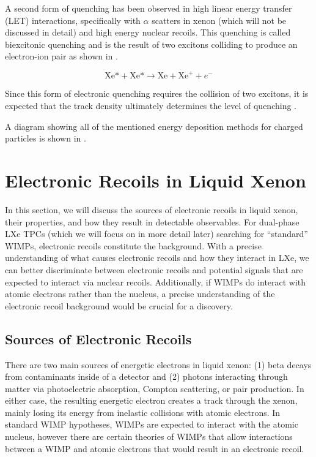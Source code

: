 A second form of quenching has been observed in high linear energy transfer (LET) interactions, specifically with $\alpha$ scatters in xenon (which will not be discussed in detail) and high energy nuclear recoils.  This quenching is called biexcitonic quenching and is the result of two excitons colliding to produce an electron-ion pair as shown in .

\begin{equation}
        \label{eqn:biexcitonic_quenching} 
        \textrm{Xe*} + \textrm{Xe*} \rightarrow \textrm{Xe} + \textrm{Xe}^+ + e^-
\end{equation}

Since this form of electronic quenching requires the collision of two excitons, it is expected that the track density ultimately determines the level of quenching \cite{hitachi2005properties}.

A diagram showing all of the mentioned energy deposition methods for charged particles is shown in .



\section{Electronic Recoils in Liquid Xenon}
\label{sec:lxe_er}

In this section, we will discuss the sources of electronic recoils in liquid xenon, their properties, and how they result in detectable observables.  For dual-phase LXe TPCs (which we will focus on in more detail later) searching for ``standard'' WIMPs, electronic recoils constitute the background.  With a precise understanding of what causes electronic recoils and how they interact in LXe, we can better discriminate between electronic recoils and potential signals that are expected to interact via nuclear recoils.  Additionally, if WIMPs do interact with atomic electrons rather than the nucleus, a precise understanding of the electronic recoil background would be crucial for a discovery.  

\subsection{Sources of Electronic Recoils}

There are two main sources of energetic electrons in liquid xenon: (1) beta decays from contaminants inside of a detector and (2) photons interacting through matter via photoelectric absorption, Compton scattering, or pair production.  In either case, the resulting energetic electron creates a track through the xenon, mainly losing its energy from inelastic collisions with atomic electrons.   In standard WIMP hypotheses, WIMPs are expected to interact with the atomic nucleus, however there are certain theories of WIMPs that allow interactions between a WIMP and atomic electrons that would result in an electronic recoil. 

